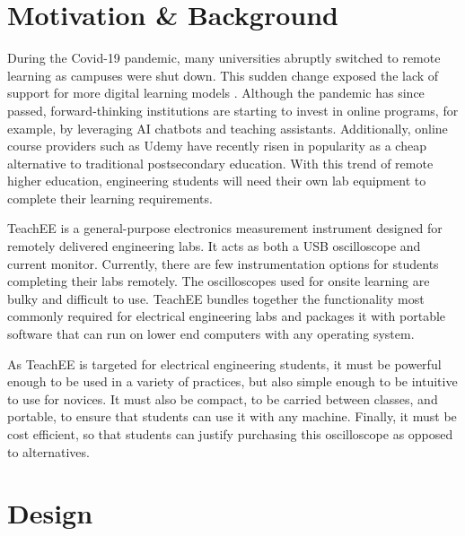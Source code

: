 \documentclass[letterpaper,11pt]{article}
\begin{document}
\section{Motivation \& Background}
During the Covid-19 pandemic, many universities abruptly switched to remote
learning as campuses were shut down. This sudden change exposed the lack of
support for more digital learning models \cite{online_learning}. Although the
pandemic has since passed, forward-thinking institutions are starting to invest
in online programs, for example, by leveraging AI chatbots and teaching assistants.
Additionally, online course providers such as Udemy have recently risen in popularity
as a cheap alternative to traditional postsecondary education. With this trend of
remote higher education, engineering students will need their own lab equipment to
complete their learning requirements.

TeachEE is a general-purpose electronics measurement instrument
designed for remotely delivered engineering labs. It acts as both a
USB oscilloscope and current monitor. Currently, there are few instrumentation
options for students completing their labs remotely. The oscilloscopes used for
onsite learning are bulky and difficult to use. TeachEE bundles
together the functionality most commonly required for electrical engineering
labs and packages it with portable software that can run on lower end computers
with any operating system.

As TeachEE is targeted for electrical engineering students, it must be powerful
enough to be used in a variety of practices, but also simple enough to
be intuitive to use for novices. It must also be compact, to be carried between classes,
and portable, to ensure that students can use it with any machine. Finally, it must be
cost efficient, so that students can justify purchasing this oscilloscope
as opposed to alternatives.

\section{Design}
\end{document}
